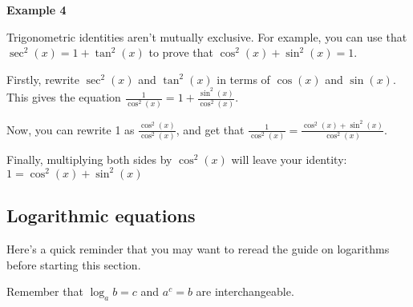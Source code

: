 \documentclass[
  12pt,
  a4paper, oneside]{starmastarticle}
\begin{document}
\begin{tcolorbox}[enhanced jigsaw, leftrule=.75mm, rightrule=.15mm, breakable, left=2mm, colback=white, bottomrule=.15mm, arc=.35mm, toprule=.15mm, opacityback=0, colframe=quarto-callout-note-color-frame]
\begin{minipage}[t]{5.5mm}
\textcolor{quarto-callout-note-color}{\faInfo}
\end{minipage}%
\begin{minipage}[t]{\textwidth - 5.5mm}

\textbf{Example 4}\vspace{2mm}

Trigonometric identities aren't mutually exclusive. For example, you can
use that \(\sec^2(x)=1+\tan^2(x)\) to prove that
\(\cos^2(x)+\sin^2(x)=1\).

Firstly, rewrite \(\sec^2(x)\) and \(\tan^2(x)\) in terms of \(\cos(x)\)
and \(\sin(x)\). This gives the equation
\(\frac{1}{\cos^2(x)}= 1 + \frac{\sin^2(x)}{\cos^2(x)}\).

Now, you can rewrite 1 as \(\frac{\cos^2(x)}{\cos^2(x)}\), and get that
\(\frac{1}{\cos^2(x)}=\frac{\cos^2(x)+\sin^2(x)}{\cos^2(x)}\).

Finally, multiplying both sides by \(\cos^2(x)\) will leave your
identity: \(1= \cos^2(x)+\sin^2(x)\)

\end{minipage}%
\end{tcolorbox}

\hypertarget{logarithmic-equations}{%
\subsection*{Logarithmic equations}\label{logarithmic-equations}}

Here's a quick reminder that you may want to reread the guide on
logarithms before starting this section.

\begin{tcolorbox}[enhanced jigsaw, bottomtitle=1mm, colbacktitle=quarto-callout-tip-color!10!white, toprule=.15mm, title=\textcolor{quarto-callout-tip-color}{\faLightbulb}\hspace{0.5em}{Tip}, colback=white, opacitybacktitle=0.6, arc=.35mm, titlerule=0mm, leftrule=.75mm, rightrule=.15mm, breakable, left=2mm, bottomrule=.15mm, toptitle=1mm, opacityback=0, coltitle=black, colframe=quarto-callout-tip-color-frame]

Remember that \(\log_{a}{b}=c\) and \(a^c=b\) are interchangeable.

\end{tcolorbox}
\end{document}
